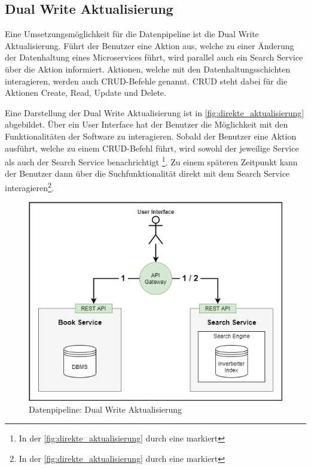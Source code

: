 \subsection{Dual Write Aktualisierung\label{subsec4.1.2:Unterunterpunkt-2}}

Eine Umsetzungsmöglichkeit für die Datenpipeline ist die \glqq Dual Write Aktualisierung\grqq{}. Führt der Benutzer eine Aktion aus, welche zu einer Änderung der Datenhaltung eines Microservices führt, wird parallel auch ein Search Service über die Aktion informiert. Aktionen, welche mit den Datenhaltungsschichten interagieren, werden auch CRUD-Befehle genannt. CRUD steht dabei für die Aktionen \glqq Create\grqq{}, \glqq Read\grqq{}, \glqq Update\grqq{} und \glqq Delete\grqq{}.

Eine Darstellung der \glqq Dual Write Aktualisierung\grqq{} ist in \autoref{fig:direkte_aktualisierung} abgebildet. Über ein User Interface hat der Benutzer die Möglichkeit mit den Funktionalitäten der Software zu interagieren. Sobald der Benutzer eine Aktion ausführt, welche zu einem CRUD-Befehl führt, wird sowohl der jeweilige Service als auch der Search Service benachrichtigt \footnote{In der \autoref{fig:direkte_aktualisierung} durch eine \grqq{} markiert}. Zu einem späteren Zeitpunkt kann der Benutzer dann über die Suchfunktionalität direkt mit dem Search Service interagieren\footnote{In der \autoref{fig:direkte_aktualisierung} durch eine \grqq{} markiert}.

\begin{figure}[H]
    \centering
    \includegraphics[width=0.6\linewidth]{images/direkte_aktualisierung.png}
    \caption{Datenpipeline: Dual Write Aktualisierung}
    \label{fig:direkte_aktualisierung}
\end{figure}

